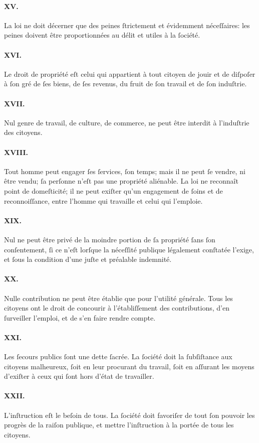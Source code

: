 \documentclass[10pt]{lecturenotes}
\begin{document}
\paragraph*{XV.}La loi ne doit décerner que des peines ſtrictement et évidemment néceſſaires: les peines doivent être proportionnées au délit et utiles à la ſociété.
\paragraph*{XVI.}Le droit de propriété eſt celui qui appartient à tout citoyen de jouir et de diſpoſer à ſon gré de ſes biens, de ſes revenus, du fruit de ſon travail et de ſon induſtrie.
\paragraph*{XVII.}Nul genre de travail, de culture, de commerce, ne peut être interdit à l'induſtrie des citoyens.
\paragraph*{XVIII.}Tout homme peut engager ſes ſervices, ſon temps; mais il ne peut ſe vendre, ni être vendu; ſa perſonne n'eſt pas une propriété aliénable. La loi ne reconnaît point de domeſticité; il ne peut exiſter qu'un engagement de ſoins et de reconnoiſſance, entre l'homme qui travaille et celui qui l'emploie.
\paragraph*{XIX.}Nul ne peut être privé de la moindre portion de ſa propriété ſans ſon conſentement, ſi ce n'eſt lorſque la néceſſité publique légalement conſtatée l'exige, et ſous la condition d'une juſte et préalable indemnité.
\paragraph*{XX.}Nulle contribution ne peut être établie que pour l'utilité générale. Tous les citoyens ont le droit de concourir à l'établiſſement des contributions, d'en ſurveiller l'emploi, et de s'en faire rendre compte.
\paragraph*{XXI.}Les ſecours publics ſont une dette ſacrée. La ſociété doit la ſubſiſtance aux citoyens malheureux, ſoit en leur procurant du travail, ſoit en aſſurant les moyens d'exiſter à ceux qui ſont hors d'état de travailler.
\paragraph*{XXII.}L'inſtruction eſt le beſoin de tous. La ſociété doit favoriſer de tout ſon pouvoir les progrès de la raiſon publique, et mettre l'inſtruction à la portée de tous les citoyens.
\end{document}
